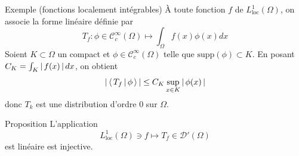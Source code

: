         \begin{demo}{Exemple (fonctions localement intégrables)}
            À toute fonction $f$ de $L^1_{\text{loc}}(\Omega)$, on associe la forme linéaire définie par 
            \[ T_f : \phi \in \mathcal{C}_c^{\infty}(\Omega) \mapsto \int_{\Omega} f(x) \phi(x) dx \]
            Soient $K \subset \Omega$ un compact et $\phi \in \mathcal{C}_c^{\infty}(\Omega)$ telle que $\text{supp}(\phi) \subset K$. En posant $C_K = \int_{K} \left\lvert \, f(x) \, \right\rvert dx$, on obtient 
            \[ \left\lvert \, \left< \, T_f \, \middle| \, \phi \, \right> \, \right\rvert \leq C_K \sup_{x \in K} \left\lvert \, \phi(x) \, \right\rvert \]
            donc $T_k$ est une distribution d’ordre $0$ sur $\Omega$.
        \end{demo}

        \begin{omed}{Proposition}
            L’application 
            \[ L^1_{\text{loc}}(\Omega) \ni f \longmapsto T_f \in \mathcal{D}'(\Omega) \]   
            est linéaire est injective.
        \end{omed}

